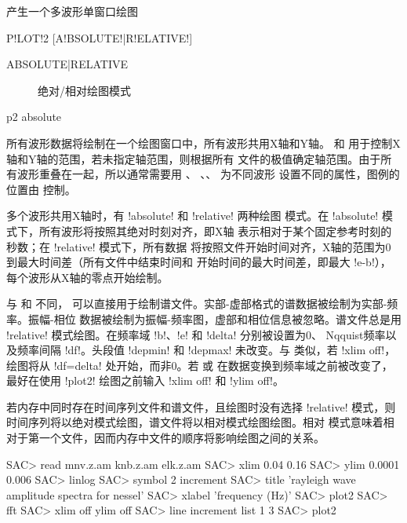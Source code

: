 \label{cmd:plot2}

产生一个多波形单窗口绘图

\begin{SACSTX}
P!LOT!2 [A!BSOLUTE!|R!ELATIVE!]
\end{SACSTX}

\begin{description}
\item [ABSOLUTE|RELATIVE] 绝对/相对绘图模式
\end{description}

\begin{SACDFT}
p2 absolute
\end{SACDFT}

所有波形数据将绘制在一个绘图窗口中，所有波形共用X轴和Y轴。
和  用于控制X轴和Y轴的范围，若未指定轴范围，则根据所有
文件的极值确定轴范围。由于所有波形重叠在一起，所以通常需要用 、
、、 为不同波形
设置不同的属性，图例的位置由  控制。

多个波形共用X轴时，有 !absolute! 和 !relative! 两种绘图
模式。在 !absolute! 模式下，所有波形将按照其绝对时刻对齐，即X轴
表示相对于某个固定参考时刻的秒数；在 !relative! 模式下，所有数据
将按照文件开始时间对齐，X轴的范围为0到最大时间差（所有文件中结束时间和
开始时间的最大时间差，即最大 !e-b!），每个波形从X轴的零点开始绘制。

与  和  不同，
可以直接用于绘制谱文件。实部-虚部格式的谱数据被绘制为实部-频率。振幅-相位
数据被绘制为振幅-频率图，虚部和相位信息被忽略。谱文件总是用 !relative!
模式绘图。在频率域 !b!、!e! 和 !delta! 分别被设置为0、
Nqquist频率以及频率间隔 !df!。头段值 !depmin! 和 !depmax!
未改变。与  类似，若 !xlim off!，绘图将从
!df=delta! 处开始，而非0。若  或 
在数据变换到频率域之前被改变了，最好在使用 !plot2! 绘图之前输入
!xlim off! 和 !ylim off!。

若内存中同时存在时间序列文件和谱文件，且绘图时没有选择 !relative!
模式，则时间序列将以绝对模式绘图，谱文件将以相对模式绘图绘图。相对
模式意味着相对于第一个文件，因而内存中文件的顺序将影响绘图之间的关系。

\begin{SACCode}
SAC> read mnv.z.am knb.z.am elk.z.am
SAC> xlim 0.04 0.16
SAC> ylim 0.0001 0.006
SAC> linlog
SAC> symbol 2 increment
SAC> title 'rayleigh wave amplitude spectra for nessel'
SAC> xlabel 'frequency (Hz)'
SAC> plot2
SAC> fft
SAC> xlim off ylim off
SAC> line increment list 1 3
SAC> plot2
\end{SACCode}
